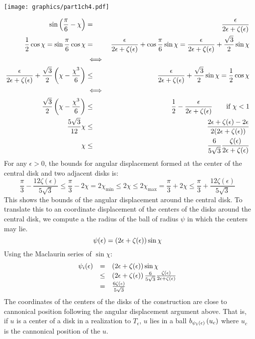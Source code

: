 \begin{minipage}{\linewidth}
\begin{center}
\texttt{[image: graphics/part1ch4.pdf]}
\label{fig:part1ch4.pdf}
\end{center}
\end{minipage}

\begin{eqnarray*}
\sin \left( \frac{\pi}{6} - \chi \right) &=& \frac{\epsilon}{2\epsilon+\zeta(\epsilon)}\\
\frac{1}{2}\cos \chi = \sin \frac{\pi}{6} \cos \chi &=& \frac{\epsilon}{2\epsilon+\zeta(\epsilon)} + \cos \frac{\pi}{6} \sin \chi = \frac{\epsilon}{2\epsilon+\zeta(\epsilon)} +\frac{\sqrt{3}}{2} \sin \chi \\
&\iff&\\
\frac{\epsilon}{2\epsilon+\zeta(\epsilon)} + \frac{\sqrt{3}}{2} \left(  \chi - \frac{\chi^3}{6} \right) &\leq& \frac{\epsilon}{2\epsilon+\zeta(\epsilon)} + \frac{\sqrt{3}}{2} \sin \chi =\frac{1}{2} \cos \chi\\
&\iff&\\
\frac{\sqrt{3}}{2} \left(  \chi - \frac{\chi^3}{6} \right)&\leq& \frac{1}{2}-\frac{\epsilon}{2\epsilon+\zeta(\epsilon)}  \qquad \text{if }\chi < 1 \\
\frac{5\sqrt{3}}{12} \chi &\leq&\frac{2\epsilon + \zeta(\epsilon) - 2\epsilon}{2 ( 2\epsilon + \zeta(\epsilon))} \\
\chi &\leq& \frac{6}{5 \sqrt{3}}\frac{\zeta(\epsilon)}{ 2\epsilon + \zeta(\epsilon)} 
\end{eqnarray*}
For any $\epsilon > 0$, the bounds for angular displacement formed at the center of the central disk and two adjacent disks is:
$$ \frac{\pi}{3} - \frac{12 \zeta(\epsilon)}{5\sqrt{3}} \leq \frac{\pi}{3} - 2 \chi = 2\chi_\text{min} \leq 2\chi \leq 2\chi_\text{max} = \frac{\pi}{3} + 2 \chi \leq \frac{\pi}{3} + \frac{12 \zeta(\epsilon)}{5\sqrt{3}}$$
This shows the bounds of the angular displacement around the central disk.  
To translate this to an coordinate displacement of the centers of the disks around the central disk, we compute a the radius of the ball of radius $\psi$ in which the centers may lie. 
$$\psi(\epsilon) = \left( 2 \epsilon + \zeta(\epsilon) \right) \sin \chi$$
Using the Maclaurin series of $\sin \chi$:
$$
\begin{array}{rcl}
\psi_i(\epsilon) &=& \left( 2 \epsilon + \zeta(\epsilon) \right) \sin \chi\\
&\leq& \left( 2 \epsilon + \zeta(\epsilon) \right) \frac{6}{5 \sqrt{3}}\frac{\zeta(\epsilon)}{ 2\epsilon+ \zeta(\epsilon)} \\
&=& \frac{6\zeta(\epsilon)}{5 \sqrt{3}}
\end{array}
$$
The coordinates of the centers of the disks of the construction are close to cannonical position following the angular displacement argument above.  
That is, if $u$ is a center of a disk in a realization to $T_\epsilon$, $u$ lies in a ball $b_{\psi_1(\epsilon)}\left( u_c \right)$ where $u_c$ is the cannonical position of the $u$.  

